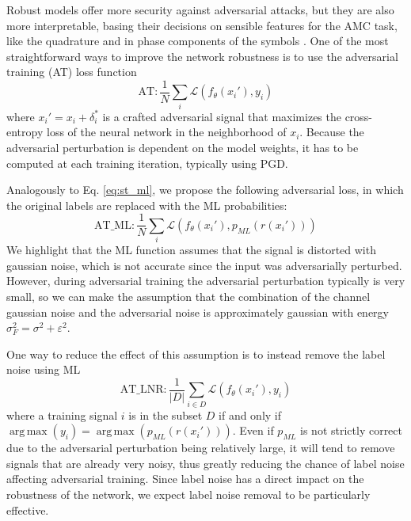 \documentclass[conference]{IEEEtran}
\newcommand{\Ls}{\mathcal{L}}
\DeclareMathOperator*{\argmax}{arg\,max}
\begin{document}
Robust models offer more security against adversarial attacks, but they are also more interpretable, basing their decisions on sensible features for the AMC task, like the quadrature and in phase components of the symbols \cite{maroto2021safeamc}. One of the most straightforward ways to improve the network robustness is to use the adversarial training (AT) loss function
\begin{equation}
    \text{AT} : \dfrac{1}{N}\sum_{i}\Ls(f_{\theta}(x_i'), y_i)
\end{equation}
where $x_i' = x_i + \delta_i^*$ is a crafted adversarial signal that maximizes the cross-entropy loss of the neural network in the neighborhood of $x_i$. Because the adversarial perturbation is dependent on the model weights, it has to be computed at each training iteration, typically using PGD.

Analogously to Eq. \eqref{eq:st_ml}, we propose the following adversarial loss, in which the original labels are replaced with the ML probabilities:
\begin{equation}
    \text{AT\_ML} : \dfrac{1}{N}\sum_{i}\Ls(f_{\theta}(x_i'), p_{ML}(r(x_i')))
\end{equation}
We highlight that the ML function assumes that the signal is distorted with gaussian noise, which is not accurate since the input was adversarially perturbed. However, during adversarial training the adversarial perturbation typically is very small, so we can make the assumption that the combination of the channel gaussian noise and the adversarial noise is approximately gaussian with energy $\sigma_F^{2} = \sigma^{2} + \varepsilon^{2}$.

One way to reduce the effect of this assumption is to instead remove the label noise using ML
\begin{equation}
    \text{AT\_LNR} : \dfrac{1}{|D|}\sum_{i \in D}\Ls(f_{\theta}(x_i'), y_i)
\end{equation}
where a training signal $i$ is in the subset $D$ if and only if $\argmax(y_i) = \argmax(p_{ML}(r(x_i')))$. 
Even if $p_{ML}$ is not strictly correct due to the adversarial perturbation being relatively large, it will tend to remove signals that are already very noisy, thus greatly reducing the chance of label noise affecting adversarial training. Since label noise has a direct impact on the robustness of the network, we expect label noise removal to be particularly effective.
\end{document}
